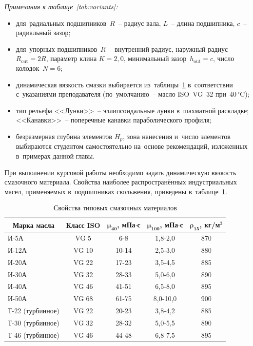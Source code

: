 \textit{Примечания к таблице~\ref{tab:variants}:}
\begin{itemize}
\item для~радиальных подшипников~$R$~-- радиус вала, $L$~-- длина подшипника, $c$~-- радиальный зазор;
\item для~упорных подшипников~$R$~-- внутренний радиус, наружный радиус $R_{\mathrm{out}} = 2R$, параметр клина $K = 2{,}0$, минимальный зазор~$h_{\mathrm{out}} = c$, число колодок~$N = 6$;
\item динамическая вязкость смазки выбирается из~таблицы~\ref{tab:lubricants} в~соответствии с~указаниями преподавателя (по~умолчанию~-- масло ISO~VG~32 при~$40\,^{\circ}$C);
\item тип рельефа <<Лунки>>~-- эллипсоидальные лунки в~шахматной раскладке; <<Канавки>>~-- поперечные канавки параболического профиля;
\item безразмерная глубина элементов $H_p$, зона нанесения и~число элементов выбираются студентом самостоятельно на~основе рекомендаций, изложенных в~примерах данной главы.
\end{itemize}


При выполнении курсовой работы необходимо задать динамическую вязкость смазочного материала. Свойства наиболее распространённых индустриальных масел, применяемых в~подшипниках скольжения, приведены в~таблице~\ref{tab:lubricants}.

\begin{table}[!ht]
\centering
\caption{Свойства типовых смазочных материалов}
\label{tab:lubricants}
\small
\begin{tabularx}{\textwidth}{|X|c|c|c|c|}
\hline
\multicolumn{1}{|c|}{\textbf{Марка масла}} & \textbf{Класс ISO} & $\boldsymbol{\mu_{40}}$, \textbf{мПа$\cdot$с} & $\boldsymbol{\mu_{100}}$, \textbf{мПа$\cdot$с} & $\boldsymbol{\rho_{15}}$, \textbf{кг/м$^3$} \\
\hline
И-5А        & VG 5  & 6-8     & 1{,}8-2{,}0  & 870 \\
\hline
И-12А       & VG 10 & 10-14   & 2{,}5-3{,}0  & 880 \\
\hline
И-20А       & VG 22 & 17-23   & 3{,}5-4{,}5  & 885 \\
\hline
И-30А       & VG 32 & 28-33   & 5{,}0-6{,}0  & 890 \\
\hline
И-40А       & VG 46 & 41-51   & 6{,}5-8{,}0  & 895 \\
\hline
И-50А       & VG 68 & 61-75   & 8{,}0-10{,}0 & 900 \\
\hline
Т-22 (турбинное) & VG 22 & 20-23 & 3{,}8-4{,}2 & 885 \\
\hline
Т-30 (турбинное) & VG 32 & 28-32 & 5{,}0-5{,}5 & 890 \\
\hline
Т-46 (турбинное) & VG 46 & 44-48 & 6{,}8-7{,}5 & 895 \\
\hline
\end{tabularx}
\end{table}

